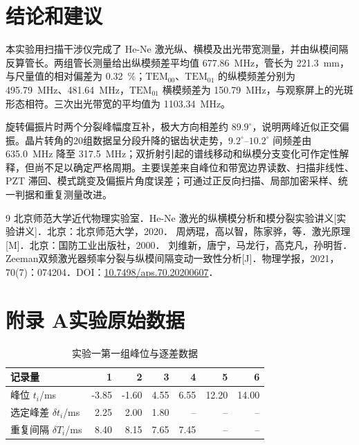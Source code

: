 \documentclass[UTF8,a4paper,10pt]{ctexart}
\begin{document}
\section{结论和建议}

本实验用扫描干涉仪完成了 He-Ne 激光纵、横模及出光带宽测量，并由纵模间隔反算管长。两组管长测量给出纵模频差平均值 \SI{677.86}{\mega\hertz}，管长为 \SI{221.3}{\milli\metre}，与尺量值的相对偏差为 \SI{0.32}{\percent}；$\mathrm{TEM}_{00}$、$\mathrm{TEM}_{01}$ 的纵模频差分别为 \SI{495.79}{\mega\hertz}、\SI{481.64}{\mega\hertz}，$\mathrm{TEM}_{01}$ 横模频差为 \SI{150.79}{\mega\hertz}，与观察屏上的光斑形态相符。三次出光带宽的平均值为 \SI{1103.34}{\mega\hertz}。

旋转偏振片时两个分裂峰幅度互补，极大方向相差约 $89.9^\circ$，说明两峰近似正交偏振。晶片转角的20组数据呈分段升降的锯齿状走势，$9.2^\circ$--$10.2^\circ$ 间频差由 \SI{635.0}{\mega\hertz} 降至 \SI{317.5}{\mega\hertz}；双折射引起的谱线移动和纵模分支变化可作定性解释，但尚不足以确定严格周期。主要误差来自峰位和带宽边界读数、扫描非线性、PZT 滞回、模式跳变及偏振片角度误差；可通过正反向扫描、局部加密采样、统一判据和重复测量改进。

\renewcommand{\refname}{六、参考文献}
\begin{thebibliography}{9}
   北京师范大学近代物理实验室．He-Ne 激光的纵横模分析和模分裂实验讲义[实验讲义]．北京：北京师范大学，2020．
   周炳琨，高以智，陈家骅，等．激光原理[M]．北京：国防工业出版社，2000．
   刘维新，唐宁，马龙行，高克凡，孙明哲．Zeeman双频激光器频率分裂与纵模间隔变动一致性分析[J]．物理学报，2021，70(7)：074204．DOI：\href{https://doi.org/10.7498/aps.70.20200607}{10.7498/aps.70.20200607}．
\end{thebibliography}

\clearpage
\appendix
\renewcommand{\thetable}{A\arabic{table}}
\setcounter{table}{0}
\section*{附录 A\quad 实验原始数据}

\begin{table}[H]
  \centering
  \caption{实验一第一组峰位与逐差数据}
  \label{tab:exp1-raw}
  \begin{tabular}{lrrrrrr}
    \toprule
    记录量 & 1 & 2 & 3 & 4 & 5 & 6 \\
    \midrule
    峰位 $t_i$/ms & -3.85 & -1.60 & 4.55 & 6.55 & 12.20 & 14.00 \\
    选定峰差 $\delta t_i$/ms & 2.25 & 2.00 & 1.80 & -- & -- & -- \\
    重复间隔 $\delta T_i$/ms & 8.40 & 8.15 & 7.65 & 7.45 & -- & -- \\
    \bottomrule
  \end{tabular}
\end{table}
\end{document}
